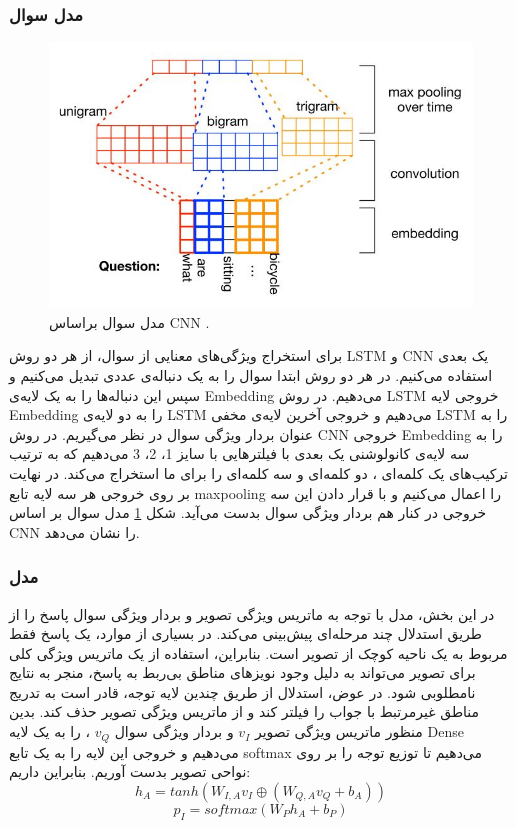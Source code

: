 {{		\subsubsection{مدل سوال}
		{
			\begin{figure}
				\centering
				\includegraphics[scale=0.5]{images/san_cnn.jpg}
				\caption{مدل سوال براساس CNN .}
				\label{fig:2}
			\end{figure}
			برای استخراج ویژگی‌های معنایی از سوال، از هر دو روش  LSTM‌ و CNN یک بعدی استفاده می‌کنیم. در هر دو روش ابتدا سوال را به یک دنباله‌ی عددی تبدیل می‌کنیم و سپس این دنباله‌ها را به یک لایه‌ی Embedding‌ می‌دهیم. در روش
			 LSTM
			خروجی لایه Embedding را به دو لایه‌ی LSTM می‌دهیم و خروجی آخرین لایه‌ی مخفی LSTM را به عنوان بردار ویژگی سوال در نظر می‌گیریم. در روش CNN خروجی Embedding را به سه لایه‌ی کانولوشنی یک بعدی با فیلترهایی با سایز 1، 2، 3 می‌دهیم که به ترتیب ترکیب‌های یک کلمه‌ای ، دو کلمه‌ای و سه کلمه‌ای را برای ما استخراج می‌کند. در نهایت بر روی خروجی هر سه لایه تابع maxpooling  را اعمال می‌کنیم و با قرار دادن این سه خروجی در کنار هم بردار ویژگی سوال بدست می‌آید. شکل 
			\ref{fig:2}
			مدل سوال بر اساس CNN را نشان می‌دهد.
		}
	
		\subsubsection{مدل }
		{
			در این بخش، مدل
			 با توجه به ماتریس ویژگی تصویر و بردار ویژگی سوال پاسخ را از طریق استدلال چند مرحله‌ای پیش‌بینی می‌کند. در بسیاری  از موارد، یک پاسخ فقط مربوط به یک ناحیه کوچک از تصویر است. بنابراین، استفاده از یک ماتریس ویژگی کلی  برای تصویر می‌تواند به دلیل وجود نویزهای مناطق بی‌ربط  به پاسخ، منجر به نتایج نامطلوبی شود. در عوض، استدلال از طریق چندین لایه توجه، قادر است به تدریج مناطق غیرمرتبط با جواب را فیلتر کند و از ماتریس ویژگی تصویر حذف کند. بدین منظور ماتریس ویژگی تصویر
		 $v_I$
	    و بردار ویژگی سوال
	    $v_Q$
	    ، را به یک لایه Dense می‌دهیم و خروجی این لایه را به یک تابع softmax می‌دهیم تا توزیع توجه را بر روی نواحی تصویر بدست آوریم. بنابراین داریم:
	    \begin{equation}
	    	h_A = tanh (W_{I,A} v_I \oplus (W_{Q,A}v_Q + b_A))
	    \end{equation}
	    \begin{equation}
	    	p_I = softmax(W_Ph_A + b_P)
	    \end{equation}
	    
}}}
